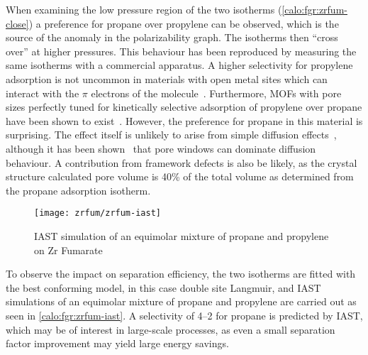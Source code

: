 When examining the low pressure region of the two isotherms 
(\autoref{calo:fgr:zrfum-close}) a preference for propane over
propylene can be observed, which is the source of the anomaly
in the polarizability graph. The isotherms then ``cross over'' 
at higher pressures.
This behaviour has been reproduced by measuring the same 
isotherms with a commercial apparatus.
A higher selectivity for propylene adsorption is not uncommon
in materials with open metal sites which can interact with 
the \(\pi\) electrons of the 
molecule~\cite{rubesAdsorptionPropanePropylene2013}.
Furthermore, MOFs with pore sizes perfectly tuned for kinetically
selective adsorption of propylene over propane have been shown 
to exist~\cite{leeKineticSeparationPropene2011}. However,
the preference for propane in this material is surprising.
The effect itself is unlikely to arise from simple diffusion
effects~\cite{granatoDiffusionPropanePropylene2010}, although
it has been shown~\cite{combarizaPropanePropyleneDiffusion2009}
that pore windows can dominate diffusion behaviour. A contribution
from framework defects is also be likely, as the 
crystal structure calculated pore volume is 40\% of the total
volume as determined from the propane adsorption isotherm.

\begin{figure}[htb]
    \centering
    \texttt{[image: zrfum/zrfum-iast]}
    \caption{IAST simulation of an equimolar mixture of 
    propane and propylene on Zr Fumarate}%
    \label{calo:fgr:zrfum-iast}

\end{figure}

To observe the impact on separation efficiency, the two isotherms 
are fitted with the best conforming model, in this case
double site Langmuir, and IAST simulations of an equimolar mixture
of propane and propylene are carried out as seen in 
\autoref{calo:fgr:zrfum-iast}. A selectivity of 4--2 for 
propane is predicted by IAST, which may be of interest in 
large-scale processes, as even a small separation factor 
improvement may yield large energy savings.

